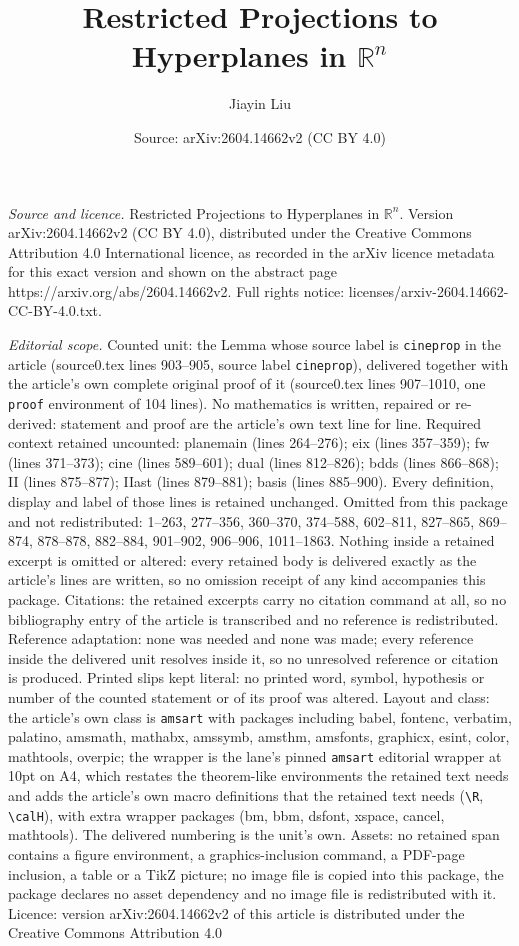 \documentclass[10pt,a4paper]{amsart}
\title[Restricted Projections to Hyperplanes in $\mathbb{R}^n$]{Restricted Projections to Hyperplanes in $\mathbb{R}^n$}
\author{Jiayin Liu}
\date{Source: arXiv:2604.14662v2 (CC BY 4.0)}
\begin{document}
\maketitle

\noindent\emph{Source and licence.} Restricted Projections to Hyperplanes in $\mathbb{R}^n$. Version arXiv:2604.14662v2 (CC BY 4.0), distributed under the Creative Commons Attribution 4.0 International licence, as recorded in the arXiv licence metadata for this exact version and shown on the abstract page https://arxiv.org/abs/2604.14662v2. Full rights notice: licenses/arxiv-2604.14662-CC-BY-4.0.txt.\par\smallskip

\noindent\textit{Editorial scope.} Counted unit: the Lemma whose source label is \texttt{cineprop} in the article (source0.tex lines 903--905, source label \texttt{cineprop}), delivered together with the article's own complete original proof of it (source0.tex lines 907--1010, one \texttt{proof} environment of 104 lines). No mathematics is written, repaired or re-derived: statement and proof are the article's own text line for line. Required context retained uncounted: planemain (lines 264--276); eix (lines 357--359); fw (lines 371--373); cine (lines 589--601); dual (lines 812--826); bdds (lines 866--868); II (lines 875--877); IIast (lines 879--881); basis (lines 885--900). Every definition, display and label of those lines is retained unchanged. Omitted from this package and not redistributed: 1--263, 277--356, 360--370, 374--588, 602--811, 827--865, 869--874, 878--878, 882--884, 901--902, 906--906, 1011--1863. Nothing inside a retained excerpt is omitted or altered: every retained body is delivered exactly as the article's lines are written, so no omission receipt of any kind accompanies this package. Citations: the retained excerpts carry no citation command at all, so no bibliography entry of the article is transcribed and no reference is redistributed. Reference adaptation: none was needed and none was made; every reference inside the delivered unit resolves inside it, so no unresolved reference or citation is produced. Printed slips kept literal: no printed word, symbol, hypothesis or number of the counted statement or of its proof was altered. Layout and class: the article's own class is \texttt{amsart} with packages including babel, fontenc, verbatim, palatino, amsmath, mathabx, amssymb, amsthm, amsfonts, graphicx, esint, color, mathtools, overpic; the wrapper is the lane's pinned \texttt{amsart} editorial wrapper at 10pt on A4, which restates the theorem-like environments the retained text needs and adds the article's own macro definitions that the retained text needs (\texttt{\textbackslash R}, \texttt{\textbackslash calH}), with extra wrapper packages (bm, bbm, dsfont, xspace, cancel, mathtools). The delivered numbering is the unit's own. Assets: no retained span contains a figure environment, a graphics-inclusion command, a PDF-page inclusion, a table or a TikZ picture; no image file is copied into this package, the package declares no asset dependency and no image file is redistributed with it. Licence: version arXiv:2604.14662v2 of this article is distributed under the Creative Commons Attribution 4.0 
\end{document}
